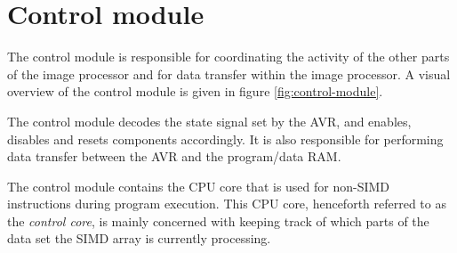 \section{Control module}

The control module is responsible for coordinating the activity of the
other parts of the image processor and for data transfer within the
image processor. A visual overview of the control module is given in
figure \ref{fig:control-module}.



The control module decodes the state signal set by the AVR, and enables,
disables and resets components accordingly. It is also responsible for
performing data transfer between the AVR and the program/data RAM.

The control module contains the CPU core that is used for non-SIMD
instructions during program execution. This CPU core, henceforth
referred to as the \emph{control core}, is mainly concerned with keeping
track of which parts of the data set the SIMD array is currently
processing.


